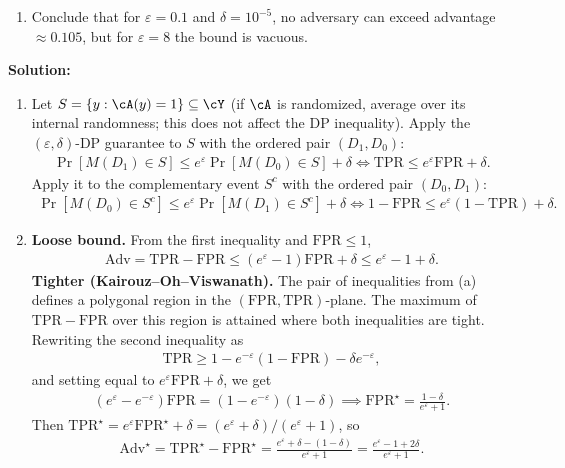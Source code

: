 \documentclass[12pt]{article}
\begin{document}
\begin{enumerate}
\begin{enumerate}
    \item Conclude that for $\varepsilon = 0.1$ and $\delta = 10^{-5}$, no adversary can exceed advantage $\approx 0.105$, but for $\varepsilon = 8$ the bound is vacuous.
\end{enumerate}

\begin{solution}
{\bf Solution:}\\
\begin{enumerate}
    \item Let $S = \{y : \cA(y) = 1\} \subseteq \cY$ (if $\cA$ is randomized, average over its internal randomness; this does not affect the DP inequality). Apply the $(\varepsilon, \delta)$-DP guarantee to $S$ with the ordered pair $(D_1, D_0)$:
    \begin{align*}
        \Pr[M(D_1) \in S] \le e^\varepsilon \Pr[M(D_0) \in S] + \delta \iff \mathrm{TPR} \le e^\varepsilon \mathrm{FPR} + \delta.
    \end{align*}
    Apply it to the complementary event $S^c$ with the ordered pair $(D_0, D_1)$:
    \begin{align*}
        \Pr[M(D_0) \in S^c] \le e^\varepsilon \Pr[M(D_1) \in S^c] + \delta \iff 1 - \mathrm{FPR} \le e^\varepsilon(1 - \mathrm{TPR}) + \delta.
    \end{align*}

    \item \textbf{Loose bound.} From the first inequality and $\mathrm{FPR} \le 1$,
    \begin{align*}
        \mathrm{Adv} = \mathrm{TPR} - \mathrm{FPR} \le (e^\varepsilon - 1)\mathrm{FPR} + \delta \le e^\varepsilon - 1 + \delta.
    \end{align*}
    \textbf{Tighter (Kairouz--Oh--Viswanath).} The pair of inequalities from (a) defines a polygonal region in the $(\mathrm{FPR}, \mathrm{TPR})$-plane. The maximum of $\mathrm{TPR} - \mathrm{FPR}$ over this region is attained where both inequalities are tight. Rewriting the second inequality as
    \begin{align*}
        \mathrm{TPR} \ge 1 - e^{-\varepsilon}(1 - \mathrm{FPR}) - \delta e^{-\varepsilon},
    \end{align*}
    and setting equal to $e^\varepsilon \mathrm{FPR} + \delta$, we get
    \begin{align*}
        (e^\varepsilon - e^{-\varepsilon})\mathrm{FPR} = (1 - e^{-\varepsilon})(1 - \delta) \implies \mathrm{FPR}^\star = \frac{1-\delta}{e^\varepsilon + 1}.
    \end{align*}
    Then $\mathrm{TPR}^\star = e^\varepsilon \mathrm{FPR}^\star + \delta = (e^\varepsilon + \delta)/(e^\varepsilon + 1)$, so
    \begin{align*}
        \mathrm{Adv}^\star = \mathrm{TPR}^\star - \mathrm{FPR}^\star = \frac{e^\varepsilon + \delta - (1 - \delta)}{e^\varepsilon + 1} = \frac{e^\varepsilon - 1 + 2\delta}{e^\varepsilon + 1}.
    \end{align*}


\end{enumerate}
\end{solution}
\end{enumerate}
\end{document}
